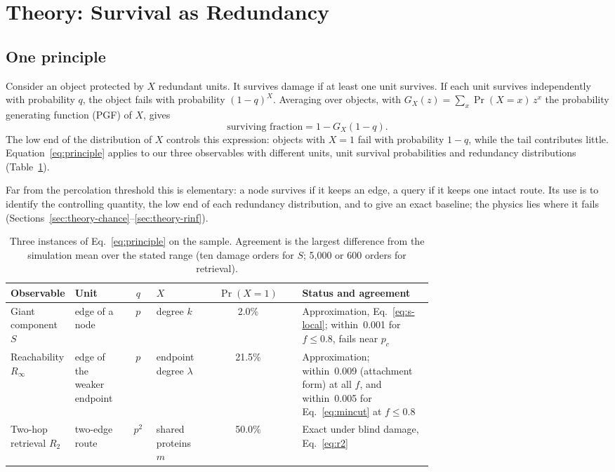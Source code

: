 \section{Theory: Survival as Redundancy}
\label{sec:theory}

\subsection{One principle}
\label{sec:theory-principle}

Consider an object protected by $X$ redundant units. It survives damage if at
least one unit survives. If each unit survives independently with probability
$q$, the object fails with probability $(1-q)^X$. Averaging over objects, with
$G_X(z)=\sum_x \Pr(X=x)\,z^x$ the probability generating function (PGF) of $X$,
gives
\begin{equation}
\text{surviving fraction}=1-G_X(1-q).
\label{eq:principle}
\end{equation}
The low end of the distribution of $X$ controls this expression: objects with
$X=1$ fail with probability $1-q$, while the tail contributes little.
Equation~\eqref{eq:principle} applies to our three observables with different
units, unit survival probabilities and redundancy distributions
(Table~\ref{tab:principle}).

Far from the percolation threshold this is elementary: a node survives if it
keeps an edge, a query if it keeps one intact route. Its use is to identify the
controlling quantity, the low end of each redundancy distribution, and to give an
exact baseline; the physics lies where it fails
(Sections~\ref{sec:theory-chance}--\ref{sec:theory-rinf}).

\begin{table}[!htbp]
\centering
\small
\caption{Three instances of Eq.~\eqref{eq:principle} on the sample.
Agreement is the largest difference from the simulation mean over the stated range (ten damage orders for $S$; 5,000 or 600 orders for retrieval).}
\label{tab:principle}
\begin{tabular}{@{}>{\raggedright\arraybackslash}p{0.15\linewidth}>{\raggedright\arraybackslash}p{0.13\linewidth}c>{\raggedright\arraybackslash}p{0.11\linewidth}c>{\raggedright\arraybackslash}p{0.31\linewidth}@{}}
\toprule
Observable & Unit & $q$ & $X$ & $\Pr(X=1)$ & Status and agreement \\
\midrule
Giant component $S$ & edge of a node & $p$ & degree $k$ & 2.0\% & Approximation, Eq.~\eqref{eq:s-local}; within~0.001 for $f\le0.8$, fails near $p_c$ \\
Reachability $R_\infty$ & edge of the weaker endpoint & $p$ & endpoint degree $\lambda$ & 21.5\% & Approximation; within~0.009 (attachment form) at all $f$, and within~0.005 for Eq.~\eqref{eq:mincut} at $f\le0.8$ \\
Two-hop retrieval $R_2$ & two-edge route & $p^2$ & shared proteins $m$ & 50.0\% & Exact under blind damage, Eq.~\eqref{eq:r2} \\
\bottomrule
\end{tabular}
\end{table}

